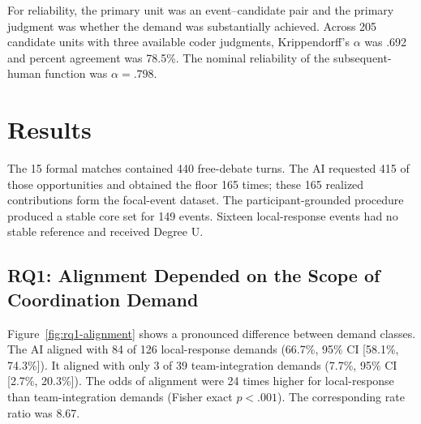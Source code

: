 \documentclass[manuscript,review,anonymous]{acmart}
\begin{document}
For reliability, the primary unit was an event--candidate pair and the primary judgment was whether the demand was substantially achieved. Across 205 candidate units with three available coder judgments, Krippendorff's $\alpha$ was .692 and percent agreement was 78.5\%. The nominal reliability of the subsequent-human function was $\alpha=.798$.

\section{Results}

The 15 formal matches contained 440 free-debate turns. The AI requested 415 of those opportunities and obtained the floor 165 times; these 165 realized contributions form the focal-event dataset. The participant-grounded procedure produced a stable core set for 149 events. Sixteen local-response events had no stable reference and received Degree U.

\subsection{RQ1: Alignment Depended on the Scope of Coordination Demand}

Figure~\ref{fig:rq1-alignment} shows a pronounced difference between demand classes. The AI aligned with 84 of 126 local-response demands (66.7\%, 95\% CI [58.1\%, 74.3\%]). It aligned with only 3 of 39 team-integration demands (7.7\%, 95\% CI [2.7\%, 20.3\%]). The odds of alignment were 24 times higher for local-response than team-integration demands (Fisher exact $p<.001$). The corresponding rate ratio was 8.67.
\end{document}
